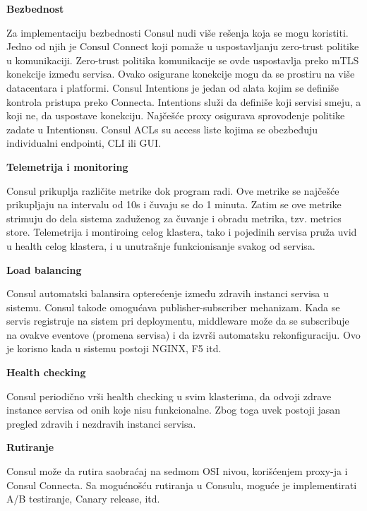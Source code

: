 \documentclass[a4paper,12pt]{report}
\begin{document}
\textbf{Bezbednost}\newline

Za implementaciju bezbednosti Consul nudi više rešenja koja se mogu koristiti. Jedno od njih je Consul Connect koji pomaže u uspostavljanju zero-trust politike u komunikaciji. Zero-trust politika komunikacije se ovde uspostavlja preko mTLS konekcije između servisa. Ovako osigurane konekcije mogu da se prostiru na više datacentara i platformi. Consul Intentions je jedan od alata kojim se definiše 	kontrola pristupa preko Connecta. Intentions služi da definiše koji servisi smeju, a koji ne, da uspostave konekciju. Najčešće proxy osigurava sprovođenje politike zadate u Intentionsu. Consul ACLs su access liste kojima se obezbeđuju individualni endpointi, CLI ili GUI.  \newline

\textbf{Telemetrija i monitoring}\newline

Consul prikuplja različite metrike dok program radi. Ove metrike se najčešće prikupljaju na intervalu od 10s i čuvaju se do 1 minuta. Zatim se ove metrike strimuju do dela sistema zaduženog za čuvanje i obradu metrika, tzv. metrics store. Telemetrija i montiroing celog klastera, tako i pojedinih servisa pruža uvid u health celog klastera, i u unutrašnje funkcionisanje svakog od servisa.  \newline

\textbf{Load balancing}\newline

Consul automatski balansira opterećenje između zdravih instanci servisa u sistemu. Consul takođe omogućava publisher-subscriber mehanizam. Kada se servis registruje na sistem pri deploymentu, middleware može da se subscribuje na ovakve eventove (promena servisa) i da izvrši automatsku rekonfiguraciju. Ovo je korisno kada u sistemu postoji NGINX, F5 itd. \newline

\textbf{Health checking}\newline

Consul periodično vrši health checking u svim klasterima, da odvoji zdrave instance servisa od onih koje nisu funkcionalne. Zbog toga uvek postoji jasan pregled zdravih i nezdravih instanci servisa. \newline

\textbf{Rutiranje}\newline

Consul može da rutira saobraćaj na sedmom OSI nivou, korišćenjem proxy-ja i Consul Connecta. Sa mogućnošću rutiranja u Consulu, moguće je implementirati A/B testiranje, Canary release, itd. \newline
\end{document}
